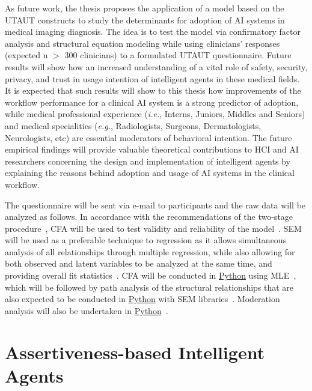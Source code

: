 As future work, the thesis proposes the application of a model based on the \ac{UTAUT} constructs to study the determinants for adoption of \ac{AI} systems in medical imaging diagnosis.
The idea is to test the model via confirmatory factor analysis and structural equation modeling while using clinicians' responses (expected n $>$ 300 clinicians) to a formulated \ac{UTAUT} questionnaire.
Future results will show how an increased understanding of a vital role of safety, security, privacy, and trust in usage intention of intelligent agents in these medical fields.
It is expected that such results will show to this thesis how improvements of the workflow performance for a clinical \ac{AI} system is a strong predictor of adoption, while medical professional experience ({\it i.e.}, Interns, Juniors, Middles and Seniors) and medical specialities ({\it e.g.}, Radiologists, Surgeons, Dermatologists, Neurologists, etc) are essential moderators of behavioral intention.
The future empirical findings will provide valuable theoretical contributions to \ac{HCI} and \ac{AI} researchers concerning the design and implementation of intelligent agents by explaining the reasons behind adoption and usage of \ac{AI} systems in the clinical workflow.

The questionnaire will be sent via e-mail to participants and the raw data will be analyzed as follows.
In accordance with the recommendations of the two-stage procedure~\cite{rahi2018investigating}, \ac{CFA} will be used to test validity and reliability of the model~\cite{crede2019questionable}.
\ac{SEM} will be used as a preferable technique to regression as it allows simultaneous analysis of all relationships through multiple regression, while also allowing for both observed and latent variables to be analyzed at the same time, and providing overall fit statistics~\cite{hair2017advanced}.
\ac{CFA} will be conducted in \href{https://www.python.org/}{Python} using \ac{MLE}~\cite{cham2017full}, which will be followed by path analysis of the structural relationships that are also expected to be conducted in \href{https://www.python.org/}{Python} with \ac{SEM} libraries~\cite{igolkina2020semopy}.
Moderation analysis will also be undertaken in \href{https://www.python.org/}{Python}~\cite{hayes2017regression}.

\section{Assertiveness-based Intelligent Agents}
\label{sec:sec008002}

